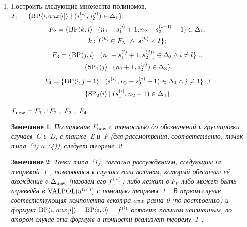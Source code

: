 \documentclass[14pt]{extarticle}
\newtheorem{note}{Замечание}
\begin{document}
\begin{enumerate}
   \item\label{buildFNew} Построить следующие множества полиномов.\\
         \multlinegap=0pt
         $F_1 = \{\mathop{\mathrm{BP}}\nolimits\langle i, aux[i]\rangle \mid (s_1^{(i)},s_2^{(i)}) \in \Delta_1\};$
         \begin{multline*}F_2 = \{\mathop{\mathrm{BP}}\nolimits\langle k, i\rangle \mid
            (n_1 - s_1^{(i)} + 1, n_2 - s_2^{(i+1)} + 1) \in
            \Delta_2,\\k: f^{(k)}\in F_N \;\wedge\; \boldsymbol{s}^{(k)} < \boldsymbol{t}\};
         \end{multline*}
         \begin{multline*}F_3 = \{\mathop{\mathrm{BP}}\nolimits\langle j, i\rangle \mid
            (n_1 - s_1^{(i)} + 1,s_2^{(j)}) \in \Delta_3 \wedge i \neq l \}\;
            \cup\\
            \{\mathop{\mathrm{SP}}\nolimits_1 \langle j\rangle \mid (n_1 + 1,s_2^{(j)}) \in \Delta_3\}
         \end{multline*}
         \begin{multline*}F_4 = \{\mathop{\mathrm{BP}}\nolimits\langle i, j-1\rangle \mid
            (s_1^{(i)}, n_2 - s_2^{(j)} + 1) \in \Delta_4 \wedge j \neq 1 \}\;
            \cup\\
            \{\mathop{\mathrm{SP}}\nolimits_2 \langle i\rangle \mid (s_1^{(i)}, n_2 + 1) \in \Delta_4\}
         \end{multline*}
         
         $F_{\text{new}} = F_1 \cup F_2 \cup F_3 \cup F_4$.
         
   \begin{note}
      Построение $F_{\text{new}}$ с точностью до обозначений и группировки случаев~C и~D,
	  а также~E и~F (для рассмотрения, соответственно, точек типа~(3) и~(4)),
	  следует теореме~2~\cite{Sakata88}.
   \end{note}
   
   \begin{note}
      Точки типа~(1), согласно рассуждениям, следующим за
      теоремой~1~\cite{Sakata88}, появляются в случаях если полином, который
      обеспечил её вхождение в $\Delta_{\text{new}}$ (назовём его $f^{(i)}$) либо лежит в
      $F_V$ либо может быть переведён в $\operatorname{VALPOL}(u^{(n')})$ с помощью
      теоремы~1~\cite{Sakata88}. В первом случае соответствующая компонента
      векотра $aux$ равна 0 (по построению) и формула $\mathop{\mathrm{BP}}\nolimits\langle i, aux[i]\rangle=
      \mathop{\mathrm{BP}}\nolimits\langle i, 0\rangle =f^{(i)}$ оставит полином неизменным, во втором случае эта формула
      в точности реализует теорему~1~\cite{Sakata88}.
   \end{note}


\end{enumerate}
\end{document}
